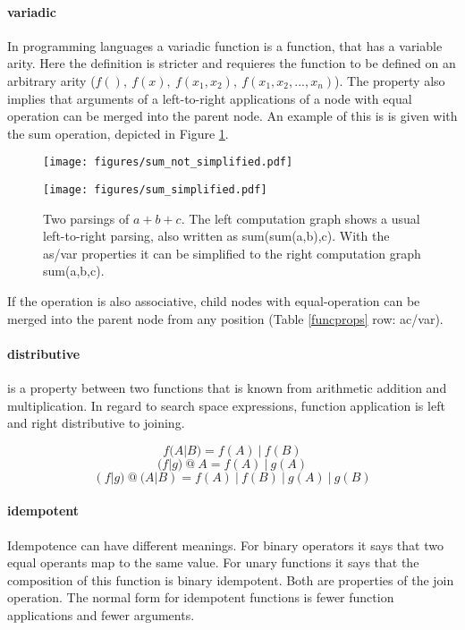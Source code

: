 \documentclass[english]{article}
\begin{document}
\paragraph{variadic}
In programming languages a variadic function is a function, that has a variable arity. Here the definition is stricter and requieres the function to be defined on an arbitrary arity ($f(),\ f(x),\ f(x_1,x_2),\ f(x_1,x_2,...,x_n)$).  The property also implies that arguments of a left-to-right applications of a node with equal operation can be merged into the parent node. An example of this is is given with the sum operation, depicted in Figure \ref{as/var transform}.

\begin{figure}

\begin{minipage}[b]{0.35\textwidth}
\caption{Two parsings of $a+b+c$. The left computation graph shows a usual left-to-right parsing, also written as sum(sum(a,b),c). With the as/var properties it can be simplified to the right computation graph sum(a,b,c).}
\label{as/var transform}
\end{minipage}%
\hfill%
\begin{minipage}[b]{0.3\textwidth}
\centering
\texttt{[image: figures/sum\_not\_simplified.pdf]}

\end{minipage}%
\hfill%
\begin{minipage}[b]{0.3\textwidth}
\centering
\texttt{[image: figures/sum\_simplified.pdf]}
\end{minipage}%
\end{figure}

If the operation is also associative, child nodes with equal-operation can be merged into the parent node from any position (Table \ref{funcprops} row: ac/var).

\paragraph{distributive} is a property between two functions that is known from arithmetic addition and multiplication. In regard to search space expressions, function application is left and right distributive to joining.

$$f(A|B) = f(A)\ |\ f(B)$$
$$(f|g)\ @\ A = f(A)\ |\ g(A)$$
$$(f|g)\ @\ (A|B) = f(A)\ |\ f(B)\ |\ g(A)\ |\ g(B)$$

\paragraph{idempotent}
Idempotence can have different meanings. For binary operators it says that two equal operants map to the same value. For unary functions it says that the composition of this function is binary idempotent. Both are properties of the join operation. The normal form for idempotent functions is fewer function applications and fewer arguments.
\end{document}
